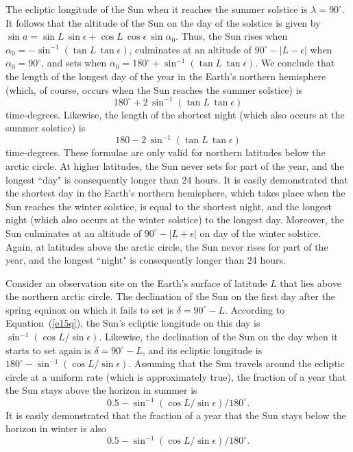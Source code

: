 The ecliptic longitude of the Sun when it reaches the summer solstice is
$\lambda = 90^\circ$. It follows that the altitude of the Sun on the day of the
solstice is given by $\sin a = \sin L\,\sin \epsilon + \cos L\,\cos\epsilon\,\sin \alpha_0$.
Thus, the Sun rises when $\alpha_0=-\sin^{-1}(\tan L\,\tan\epsilon)$, 
culminates at an altitude of $90^\circ - |L- \epsilon|$ when $\alpha_0=90^\circ$, and sets when $\alpha_0=180^\circ + \sin ^{-1}(\tan L\,\tan\epsilon)$. We conclude that the length  of the longest day of the year in the Earth's northern hemisphere
(which, of course, occurs when the Sun reaches the summer solstice)
is $$180^\circ +2\,\sin ^{-1}(\tan L\,\tan\epsilon)$$
 time-degrees. Likewise, the
length of the shortest night (which also occurs at the summer solstice) is $$180-2\, \sin^{-1}(\tan L\,\tan\epsilon)$$ time-degrees.
These formulae are only valid for northern latitudes below the arctic circle. 
At higher latitudes, the Sun never sets for part of the year, and the longest
``day" is consequently longer than 24 hours. It is easily
demonstrated that the shortest day in the Earth's northern hemisphere, which takes place when the Sun
reaches the winter solstice, is equal to the shortest night, and the longest
night (which also occurs at the winter solstice) to the longest day. Moreover, the Sun
culminates at an altitude of $90^\circ - |L + \epsilon|$  on day of the winter solstice. 
Again, at latitudes above the arctic circle,
the Sun never rises for part of the year, and the longest ``night" is
consequently longer than 24 hours. 

Consider an observation  site on the Earth's surface of latitude $L$ that lies
above the northern arctic circle. The declination of the Sun on the
first day after the spring equinox on which it fails to set is $\delta = 90^\circ - L$. According
to Equation~(\ref{e15q}), the Sun's ecliptic longitude on this day is $\sin ^{-1} (\cos L/\sin \epsilon)$.
Likewise, the declination of the Sun on the day  when it starts to  set again
is $\delta = 90^\circ - L$, and its ecliptic longitude is $180^\circ -
\sin^{-1}(\cos L/\sin \epsilon)$. Assuming that the Sun
travels around the ecliptic circle at a uniform rate (which is approximately
true), the fraction of a year that the Sun stays above the horizon
in summer is $$0.5-\sin^{-1}(\cos L/\sin \epsilon)/180^\circ.$$ It is easily
demonstrated that the fraction of a year that the Sun stays
below the horizon in winter is also  $$0.5-\sin^{-1}(\cos L/\sin \epsilon)/180^\circ.$$

